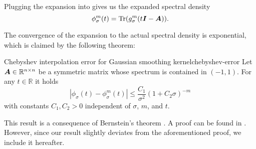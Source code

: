 Plugging the expansion  into 
 gives us the expanded
spectral density
\begin{equation}
    \phi_{\sigma}^m(t) = \operatorname{Tr}(g_{\sigma}^m(t\boldsymbol{I} - \boldsymbol{A})).
    \label{equ:2-chebyshev-spectral-density-as-trace-expansion}
\end{equation}

The convergence of the expansion to the actual spectral density is exponential, 
which is claimed by the following theorem:
\begin{theorem}{Chebyshev interpolation error for Gaussian smoothing kernel}{chebyshev-error}
    Let $\boldsymbol{A} \in \mathbb{R}^{n \times n}$ be a symmetric matrix whose spectrum
    is contained in $(-1, 1)$. For any $t \in \mathbb{R}$ it holds
    \begin{equation}
        \left|  \phi_{\sigma}(t) - \phi_{\sigma}^m(t) \right| \leq \frac{C_1}{\sigma^2}(1 + C_2 \sigma)^{-m}
        \label{equ:2-chebyshev-interpolation-error}
    \end{equation}
    with constants $C_1, C_2 > 0$ independent of $\sigma$, $m$, and $t$.
\end{theorem}
This result is a consequence of Bernstein's theorem \cite[Theorem~73]{meinardus1967approximation}.
A proof can be found in \cite[Theorem~2]{lin2017randomized}. However, since our
result slightly deviates from the aforementioned proof, we include it hereafter.
